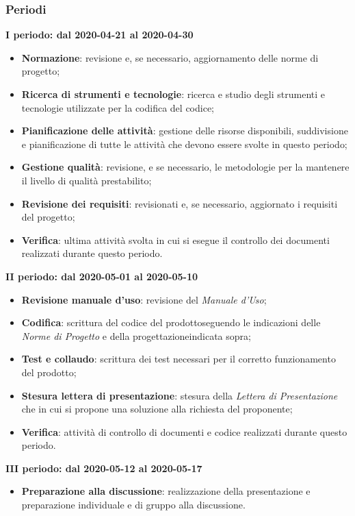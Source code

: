 \subsubsection{Periodi}
\textbf{I periodo: dal 2020-04-21 al 2020-04-30}
\begin{itemize}
	\item \textbf{Normazione}: revisione e, se necessario, aggiornamento delle norme di progetto\glo;
	\item \textbf{Ricerca di strumenti e tecnologie}: ricerca e studio degli strumenti e tecnologie utilizzate per la codifica del codice;
	\item \textbf{Pianificazione delle attività}: gestione delle risorse disponibili, suddivisione e pianificazione di tutte le attività che devono essere svolte in questo periodo;
	\item \textbf{Gestione qualità}: revisione, e se necessario, le metodologie per la mantenere il livello di qualità prestabilito;
	\item \textbf{Revisione dei requisiti}: revisionati e, se necessario, aggiornato i requisiti del progetto\glo;
	\item \textbf{Verifica}: ultima attività svolta in cui si esegue il controllo dei documenti realizzati durante questo periodo.
\end{itemize}

\textbf{II periodo: dal 2020-05-01 al 2020-05-10}
\begin{itemize}
	\item \textbf{Revisione manuale d'uso}: revisione del \textit{Manuale d'Uso};
	\item \textbf{Codifica}: scrittura del codice del prodotto\glosp seguendo le indicazioni delle \textit{Norme di Progetto} e della progettazione\glosp indicata sopra;
	\item \textbf{Test e collaudo}: scrittura dei test necessari per il corretto funzionamento del prodotto\glo;
	\item \textbf{Stesura lettera di presentazione}: stesura della \textit{Lettera di Presentazione} che in cui si propone una soluzione alla richiesta del proponente;
	\item \textbf{Verifica}: attività di controllo di documenti e codice realizzati durante questo periodo.
\end{itemize}

\textbf{III periodo: dal 2020-05-12 al 2020-05-17}
\begin{itemize}
	\item \textbf{Preparazione alla discussione}: realizzazione della presentazione e preparazione individuale e di gruppo alla discussione.
\end{itemize}